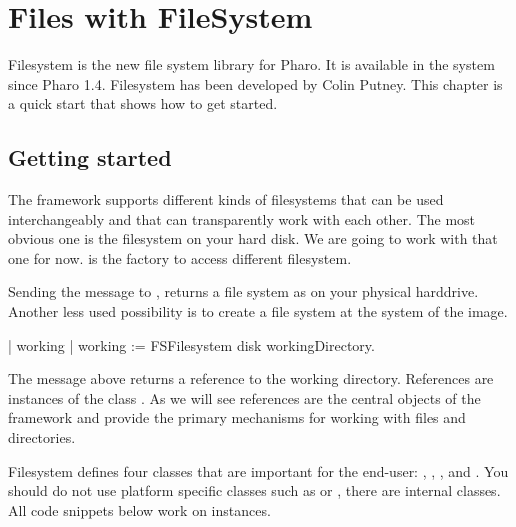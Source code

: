 \documentclass[a4paper,10pt,twoside]{book}
\begin{document}
\fi
\sloppy
\chapter{Files with FileSystem }

Filesystem is the new file system library for Pharo. It is available in the system since Pharo 1.4. 
Filesystem has been developed by Colin Putney. This chapter is a quick start that 
shows how to get started. 

\section{Getting started}
%

The framework supports different kinds of filesystems that can be used interchangeably and that can transparently work with each other. The most obvious one is the filesystem on your hard disk. We are going to work with that one for now. 
 is the factory to access different filesystem. 

Sending the message  to , returns a file system as on your physical harddrive. Another less used possibility is  to create a file system at the system of the image. 


\begin{code}{}
| working |
working := FSFilesystem disk workingDirectory.
\end{code} 

The message  above returns a reference to the working directory. References are instances of the class .  As we will see references are the central objects of the framework and provide the primary mechanisms for working with files and directories. 

Filesystem defines four classes that are important for the end-user: , , , and . You should do not use platform specific classes such as  or , there are internal classes. All code snippets below work on  instances.
\end{document}
